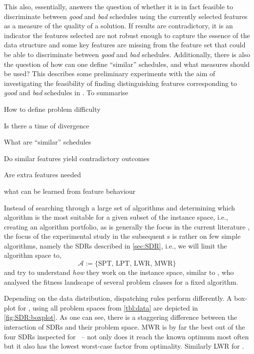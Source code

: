 This also, essentially, answers the question of whether  it is in fact feasible 
to discriminate between \emph{good} and \emph{bad} schedules using the 
currently selected features as a measure of the quality of a solution. 
If results are contradictory, it is an indicator the features selected are not 
robust enough to capture the essence of the data structure and some key 
features are missing from the feature set that could be able to discriminate 
between \emph{good} and \emph{bad} schedules. 
Additionally, there is also the question of how can one define ``similar'' 
schedules, and what measures should be used? This 
 describes some preliminary experiments with 
the aim of investigating the feasibility of finding distinguishing features 
corresponding to \emph{good} and \emph{bad} schedules in \jsp. To summarise
\begin{enumerate*}[itemjoin={{? }}, itemjoin*={{? And }}, after={{? }}]
  \item How to define problem difficulty
  \item Is there a time of divergence
  \item What are ``similar'' schedules
  \item Do similar features yield contradictory outcomes
  \item Are extra features needed
  \item what can be learned from feature behaviour
\end{enumerate*}

Instead of searching through a large set of algorithms  and determining which 
algorithm is the most suitable for a given subset of the instance space, i.e., 
creating an algorithm portfolio, as is generally the focus in the current 
literature \citep{SmithMilesLion3,SmithMilesLion5,Corne10}, the focus of the 
experimental study in the subsequent s
is rather on few simple algorithms, namely the SDRs described in 
\cref{sec:SDR}, i.e., we will limit the algorithm space to, 
\begin{equation}\label{eq:SDRset}
\mathcal{A}:=\{\text{SPT,~LPT,~LWR,~MWR}\}
\end{equation} 
and try to understand \emph{how} they work on the instance space, similar to 
\citet{Whitley}, who analysed the fitness landscape of several problem classes 
for a fixed algorithm. 

Depending on the data distribution, dispatching rules perform differently. 
A box-plot for \fullnamerho, using all problem spaces from \cref{tbl:data} are 
depicted in \cref{fig:SDR:boxplot}. 
As one can see, there is a staggering difference between the interaction of 
SDRs and their problem space. MWR is by far the best out of the four SDRs 
inspected for \JSP\ -- not only does it reach the known optimum most often but 
it also has the lowest worst-case factor from optimality. Similarly LWR for 
\FSP.

